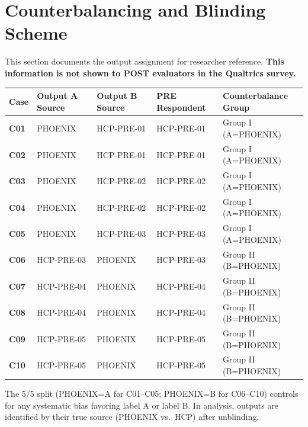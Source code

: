 \documentclass[11pt,a4paper]{article}
\renewcommand{\arraystretch}{1.30}
\begin{document}
\vspace{0.5em}

\section{Counterbalancing and Blinding Scheme}
\label{sec:counterbalancing}

\begin{counterbalbox}
\small
This section documents the output assignment for researcher reference. \textbf{This information is not shown to POST evaluators in the Qualtrics survey.}

\medskip
\begin{center}
\renewcommand{\arraystretch}{1.35}
\begin{tabular}{@{}>{\bfseries\color{PrimaryBlue}}p{}p{}p{}p{}p{}@{}}
\toprule
\textbf{Case} & \textbf{Output A Source} & \textbf{Output B Source} & \textbf{PRE Respondent} & \textbf{Counterbalance Group} \\
\midrule
C01 & PHOENIX & HCP-PRE-01 & HCP-PRE-01 & Group I (A=PHOENIX) \\
C02 & PHOENIX & HCP-PRE-01 & HCP-PRE-01 & Group I (A=PHOENIX) \\
C03 & PHOENIX & HCP-PRE-02 & HCP-PRE-02 & Group I (A=PHOENIX) \\
C04 & PHOENIX & HCP-PRE-02 & HCP-PRE-02 & Group I (A=PHOENIX) \\
C05 & PHOENIX & HCP-PRE-03 & HCP-PRE-03 & Group I (A=PHOENIX) \\
C06 & HCP-PRE-03 & PHOENIX & HCP-PRE-03 & Group II (B=PHOENIX) \\
C07 & HCP-PRE-04 & PHOENIX & HCP-PRE-04 & Group II (B=PHOENIX) \\
C08 & HCP-PRE-04 & PHOENIX & HCP-PRE-04 & Group II (B=PHOENIX) \\
C09 & HCP-PRE-05 & PHOENIX & HCP-PRE-05 & Group II (B=PHOENIX) \\
C10 & HCP-PRE-05 & PHOENIX & HCP-PRE-05 & Group II (B=PHOENIX) \\
\bottomrule
\end{tabular}
\end{center}

\medskip
The 5/5 split (PHOENIX=A for C01--C05; PHOENIX=B for C06--C10) controls for any systematic bias favoring label A or label B. In analysis, outputs are identified by their true source (PHOENIX vs.\ HCP) after unblinding.
\end{counterbalbox}
\end{document}
